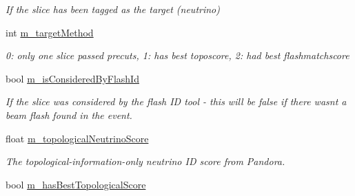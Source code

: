 \begin{DoxyCompactItemize}
\begin{DoxyCompactList}\small\item\em If the slice has been tagged as the target (neutrino) \end{DoxyCompactList}\item 
int \hyperlink{classflashmatch_1_1FlashMatchingTool_1_1SliceCandidate_a8a779ab73fe1fedf1db38b7ed2dd0a55}{m\+\_\+target\+Method}\hypertarget{classflashmatch_1_1FlashMatchingTool_1_1SliceCandidate_a8a779ab73fe1fedf1db38b7ed2dd0a55}{}\label{classflashmatch_1_1FlashMatchingTool_1_1SliceCandidate_a8a779ab73fe1fedf1db38b7ed2dd0a55}

\begin{DoxyCompactList}\small\item\em 0\+: only one slice passed precuts, 1\+: has best toposcore, 2\+: had best flashmatchscore \end{DoxyCompactList}\item 
bool \hyperlink{classflashmatch_1_1FlashMatchingTool_1_1SliceCandidate_a7ccdb127b52a9eb771c643b5623aab28}{m\+\_\+is\+Considered\+By\+Flash\+Id}\hypertarget{classflashmatch_1_1FlashMatchingTool_1_1SliceCandidate_a7ccdb127b52a9eb771c643b5623aab28}{}\label{classflashmatch_1_1FlashMatchingTool_1_1SliceCandidate_a7ccdb127b52a9eb771c643b5623aab28}

\begin{DoxyCompactList}\small\item\em If the slice was considered by the flash ID tool -\/ this will be false if there wasn\textquotesingle{}t a beam flash found in the event. \end{DoxyCompactList}\item 
float \hyperlink{classflashmatch_1_1FlashMatchingTool_1_1SliceCandidate_abbee3a2198d42d640e8087aed1eef6fe}{m\+\_\+topological\+Neutrino\+Score}\hypertarget{classflashmatch_1_1FlashMatchingTool_1_1SliceCandidate_abbee3a2198d42d640e8087aed1eef6fe}{}\label{classflashmatch_1_1FlashMatchingTool_1_1SliceCandidate_abbee3a2198d42d640e8087aed1eef6fe}

\begin{DoxyCompactList}\small\item\em The topological-\/information-\/only neutrino ID score from Pandora. \end{DoxyCompactList}\item 
bool \hyperlink{classflashmatch_1_1FlashMatchingTool_1_1SliceCandidate_a07d1352f08cbd7bba286ca9a08e6660b}{m\+\_\+has\+Best\+Topological\+Score}\hypertarget{classflashmatch_1_1FlashMatchingTool_1_1SliceCandidate_a07d1352f08cbd7bba286ca9a08e6660b}{}\label{classflashmatch_1_1FlashMatchingTool_1_1SliceCandidate_a07d1352f08cbd7bba286ca9a08e6660b}


\end{DoxyCompactItemize}

